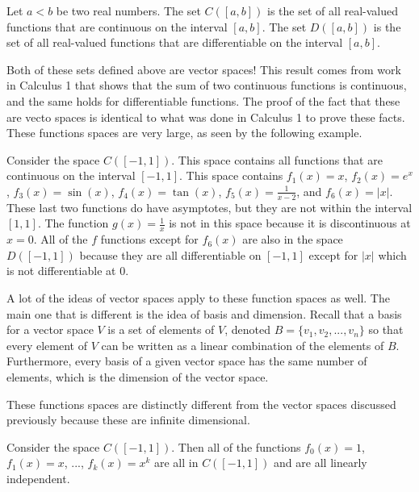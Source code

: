 \begin{definition}
Let $a < b$ be two real numbers. The set $C([a,b])$ is the set of all real-valued functions that are continuous on the interval $[a,b]$. The set $D([a,b])$ is the set of all real-valued functions that are differentiable on the interval $[a,b]$. 
\end{definition}

Both of these sets defined above are vector spaces! This result comes from work in Calculus 1 that shows that the sum of two continuous functions is continuous, and the same holds for differentiable functions. The proof of the fact that these are vecto spaces is identical to what was done in Calculus 1 to prove these facts. These functions spaces are very large, as seen by the following example.

\begin{example}
Consider the space $C([-1,1])$. This space contains all functions that are continuous on the interval $[-1,1]$. This space contains $f_1(x) = x$, $f_2(x) = e^x$, $f_3(x) = \sin(x)$, $f_4(x) = \tan(x)$, $f_5(x) = \frac{1}{x-2}$, and $f_6(x) = |x|$. These last two functions do have asymptotes, but they are not within the interval $[1,1]$. The function $g(x) = \frac{1}{x}$ is not in this space because it is discontinuous at $x=0$. All of the $f$ functions except for $f_6(x)$ are also in the space $D([-1, 1])$ because they are all differentiable on $[-1,1]$ except for $|x|$ which is not differentiable at $0$. 
\end{example}

A lot of the ideas of vector spaces apply to these function spaces as well. The main one that is different is the idea of basis and dimension. Recall that a basis for a vector space $V$ is a set of elements of $V$, denoted $B = \{v_1, v_2, ..., v_n\}$ so that every element of $V$ can be written as a linear combination of the elements of $B$. Furthermore, every basis of a given vector space has the same number of elements, which is the dimension of the vector space. 

These functions spaces are distinctly different from the vector spaces discussed previously because these are infinite dimensional.

\begin{example}
Consider the space $C([-1,1])$. Then all of the functions $f_0(x) = 1$, $f_1(x) = x$, ..., $f_k(x) = x^k$ are all in $C([-1,1])$ and are all linearly independent. 
\end{example}

